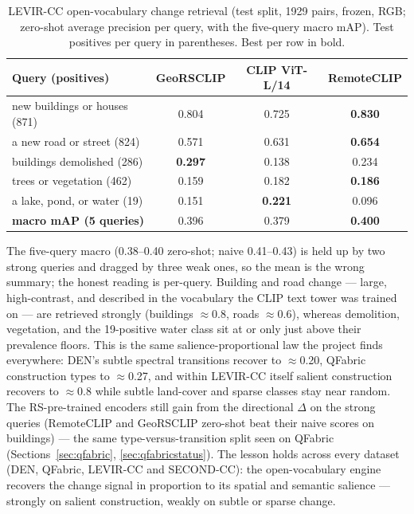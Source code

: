 \documentclass{article}
\begin{document}
\begin{table}[H]
    \centering
    \caption{LEVIR-CC open-vocabulary change retrieval (test split, 1929 pairs,
    frozen, RGB; zero-shot average precision per query, with the five-query macro
    mAP). Test positives per query in parentheses. Best per row in bold.}
    \label{tab:levircc}
    \begin{tabular}{lccc}
        \toprule
        \textbf{Query (positives)} & \textbf{GeoRSCLIP} & \textbf{CLIP ViT-L/14} & \textbf{RemoteCLIP} \\
        \midrule
        new buildings or houses (871) & 0.804 & 0.725 & \textbf{0.830} \\
        a new road or street (824)    & 0.571 & 0.631 & \textbf{0.654} \\
        buildings demolished (286)    & \textbf{0.297} & 0.138 & 0.234 \\
        trees or vegetation (462)     & 0.159 & 0.182 & \textbf{0.186} \\
        a lake, pond, or water (19)   & 0.151 & \textbf{0.221} & 0.096 \\
        \midrule
        \textbf{macro mAP (5 queries)} & 0.396 & 0.379 & \textbf{0.400} \\
        \bottomrule
    \end{tabular}
\end{table}

The five-query macro (0.38--0.40 zero-shot; naive 0.41--0.43) is held up by two
strong queries and dragged by three weak ones, so the mean is the wrong summary;
the honest reading is per-query. Building and road change --- large,
high-contrast, and described in the vocabulary the CLIP text tower was trained on
--- are retrieved strongly (buildings $\approx$0.8, roads $\approx$0.6), whereas
demolition, vegetation, and the 19-positive water class sit at or only just above
their prevalence floors. This is the same salience-proportional law the project
finds everywhere: DEN's subtle spectral transitions recover to $\approx$0.20,
QFabric construction types to $\approx$0.27, and within LEVIR-CC itself salient
construction recovers to $\approx$0.8 while subtle land-cover and sparse classes
stay near random. The RS-pre-trained encoders still gain from the directional
$\Delta$ on the strong queries (RemoteCLIP and GeoRSCLIP zero-shot beat their
naive scores on buildings) --- the same type-versus-transition split seen on
QFabric (Sections~\ref{sec:qfabric}, \ref{sec:qfabricstatus}). The lesson holds
across every dataset (DEN, QFabric, LEVIR-CC and SECOND-CC): the open-vocabulary
engine recovers the change signal in proportion to its spatial and semantic
salience --- strongly on salient construction, weakly on subtle or sparse change.
\end{document}
